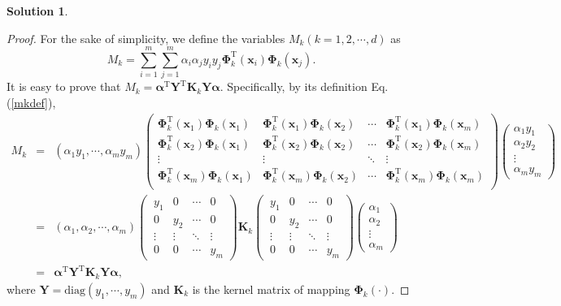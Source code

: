 \documentclass[a4paper,UTF8]{article}
\numberwithin{equation}{section}
\theoremstyle{definition}
\newtheorem*{solution}{Solution}
\begin{document}
\begin{solution}
\begin{proof}
For the sake of simplicity, we define the variables $M_k(k=1,2,\cdots, d)$ as
\begin{equation}\label{mkdef}
M_k = \sum_{i=1}^m\sum_{j=1}^m\alpha_i\alpha_jy_iy_j\bm{\Phi}_k^\mathrm{T}(\bm{x}_i)\bm{\Phi}_k(\bm{x}_j).
\end{equation}
It is easy to prove that $M_k=\bm\alpha^\mathrm{T}\bm Y^\mathrm{T} \bm K_k \bm Y  \bm \alpha$. Specifically, by its definition Eq.(\ref{mkdef}),
\begin{eqnarray}
M_k &=& \left(\alpha_1 y_1, \cdots, \alpha_m y_m\right)\left(
\begin{array}{cccc}
\bm{\Phi}_k^\mathrm{T}(\bm{x}_1)\bm{\Phi}_k(\bm{x}_1)	& \bm{\Phi}_k^\mathrm{T}(\bm{x}_1)\bm{\Phi}_k(\bm{x}_2)	& \cdots	& \bm{\Phi}_k^\mathrm{T}(\bm{x}_1)\bm{\Phi}_k(\bm{x}_m)\\
\bm{\Phi}_k^\mathrm{T}(\bm{x}_2)\bm{\Phi}_k(\bm{x}_1)	& \bm{\Phi}_k^\mathrm{T}(\bm{x}_2)\bm{\Phi}_k(\bm{x}_2)	& \cdots	& \bm{\Phi}_k^\mathrm{T}(\bm{x}_2)\bm{\Phi}_k(\bm{x}_m)\\
\vdots	& \vdots	& \ddots	& \vdots\\
\bm{\Phi}_k^\mathrm{T}(\bm{x}_m)\bm{\Phi}_k(\bm{x}_1)	& \bm{\Phi}_k^\mathrm{T}(\bm{x}_m)\bm{\Phi}_k(\bm{x}_2)	& \cdots	& \bm{\Phi}_k^\mathrm{T}(\bm{x}_m)\bm{\Phi}_k(\bm{x}_m)\\
\end{array}
\right)\left(
\begin{array}{c}
\alpha_1 y_1\\
\alpha_2 y_2\\
\vdots\\
\alpha_m y_m
\end{array}
\right)\nonumber\\
&=&\left(\alpha_1, \alpha_2, \cdots, \alpha_m\right)\left(\
\begin{array}{cccc}
y_1	& 0	& \cdots	& 0\\
0	& y_2	& \cdots	& 0\\
\vdots	& \vdots	& \ddots	& \vdots\\
0	& 0	& \cdots	& y_m
\end{array}
\right)\bm{K}_k\left(\
\begin{array}{cccc}
y_1	& 0	& \cdots	& 0\\
0	& y_2	& \cdots	& 0\\
\vdots	& \vdots	& \ddots	& \vdots\\
0	& 0	& \cdots	& y_m
\end{array}
\right)\left(
\begin{array}{c}
\alpha_1\\
\alpha_2\\
\vdots\\
\alpha_m
\end{array}
\right)\nonumber\\
&=& \bm{\alpha}^\mathrm{T}\bm{Y}^\mathrm{T}\bm{K}_k\bm{Y}\bm{\alpha},
\end{eqnarray}
where $\bm{Y}=\text{diag}(y_1,\cdots, y_m)$ and $\bm{K}_k$ is the kernel matrix of mapping $\bm{\Phi}_k(\cdot)$. 


\end{proof}
\end{solution}
\end{document}
